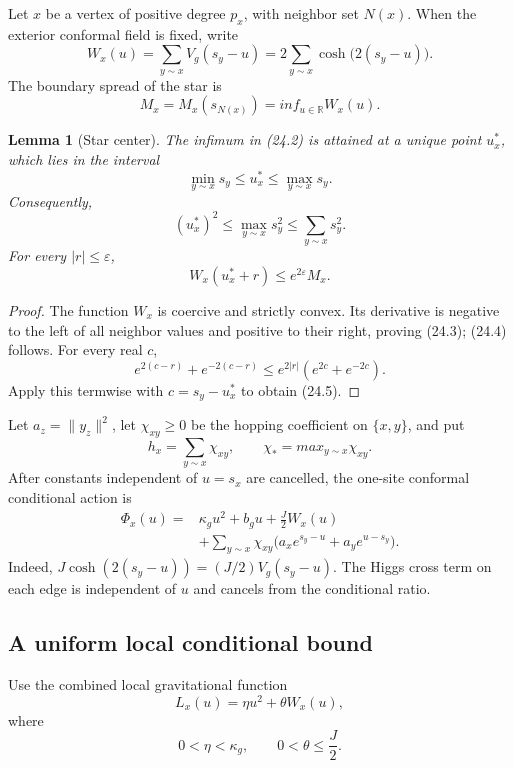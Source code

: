 \documentclass[11pt]{article}
\newtheorem{lemma}[theorem]{Lemma}
\theoremstyle{remark}
\begin{document}
Let \(x\) be a vertex of positive degree \(p_x\), with neighbor set
\(N(x)\).  When the exterior conformal field is fixed, write
\[
 W_x(u)=\sum_{y\sim x}V_g(s_y-u)
 =2\sum_{y\sim x}\cosh\bigl(2(s_y-u)\bigr).        \tag{24.1}
\]
The boundary spread of the star is
\[
 M_x=M_x(s_{N(x)})=inf_{u\in\mathbb R}W_x(u).     \tag{24.2}
\]

\begin{lemma}[Star center]
\label{lem:v17v24-center}
The infimum in (24.2) is attained at a unique point \(u_x^*\), which
lies in the interval
\[
 \min_{y\sim x}s_y\leq u_x^*\leq\max_{y\sim x}s_y. \tag{24.3}
\]
Consequently,
\[
 (u_x^*)^2\leq\max_{y\sim x}s_y^2
 \leq\sum_{y\sim x}s_y^2.                         \tag{24.4}
\]
For every \(|r|\leq\varepsilon\),
\[
 W_x(u_x^*+r)\leq e^{2\varepsilon}M_x.            \tag{24.5}
\]
\end{lemma}

\begin{proof}
The function \(W_x\) is coercive and strictly convex.  Its derivative
is negative to the left of all neighbor values and positive to their
right, proving (24.3); (24.4) follows.  For every real \(c\),
\[
 e^{2(c-r)}+e^{-2(c-r)}
 \leq e^{2|r|}(e^{2c}+e^{-2c}).                    \tag{24.6}
\]
Apply this termwise with \(c=s_y-u_x^*\) to obtain (24.5).
\end{proof}

Let \(a_z=\|y_z\|^2\), let \(\chi_{xy}\geq0\) be the hopping
coefficient on \(\{x,y\}\), and put
\[
 h_x=\sum_{y\sim x}\chi_{xy},
 \qquad \chi_*=max_{y\sim x}\chi_{xy}.           \tag{24.7}
\]
After constants independent of \(u=s_x\) are cancelled, the
one-site conformal conditional action is
\[
\begin{aligned}
 \Phi_x(u)={}&\kappa_gu^2+b_gu+\frac J2W_x(u)\\
 &+\sum_{y\sim x}\chi_{xy}
 \bigl(a_xe^{s_y-u}+a_ye^{u-s_y}\bigr).           \tag{24.8}
\end{aligned}
\]
Indeed, \(J\cosh(2(s_y-u))=(J/2)V_g(s_y-u)\).  The
Higgs cross term on each edge is independent of \(u\) and cancels from
the conditional ratio.

\subsection{A uniform local conditional bound}

Use the combined local gravitational function
\[
 L_x(u)=\eta u^2+\theta W_x(u),                    \tag{24.9}
\]
where
\[
 0<\eta<\kappa_g,
 \qquad 0<\theta\leq\frac J2.                     \tag{24.10}
\]
\end{document}
